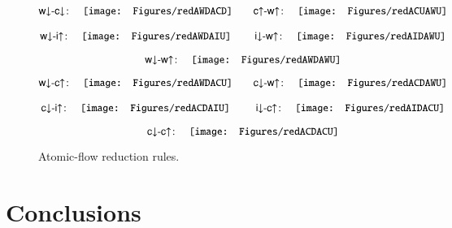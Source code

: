\newcommand{\rwdcd}{{{\mathsf w}{\downarrow}{\hbox{-}}{\mathsf c}{\downarrow}}}
\newcommand{\rwdiu}{{{\mathsf w}{\downarrow}{\hbox{-}}{\mathsf i}{\uparrow  }}}
\newcommand{\rwdwu}{{{\mathsf w}{\downarrow}{\hbox{-}}{\mathsf w}{\uparrow  }}}
\newcommand{\rwdcu}{{{\mathsf w}{\downarrow}{\hbox{-}}{\mathsf c}{\uparrow  }}}
\newcommand{\rcuwu}{{{\mathsf c}{\uparrow  }{\hbox{-}}{\mathsf w}{\uparrow  }}}
\newcommand{\rcdwu}{{{\mathsf c}{\downarrow}{\hbox{-}}{\mathsf w}{\uparrow  }}}
\newcommand{\rcdiu}{{{\mathsf c}{\downarrow}{\hbox{-}}{\mathsf i}{\uparrow  }}}
\newcommand{\rcdcu}{{{\mathsf c}{\downarrow}{\hbox{-}}{\mathsf c}{\uparrow  }}}
\newcommand{\ridwu}{{{\mathsf i}{\downarrow}{\hbox{-}}{\mathsf w}{\uparrow  }}}
\newcommand{\ridcu}{{{\mathsf i}{\downarrow}{\hbox{-}}{\mathsf c}{\uparrow  }}}
\begin{figure}[tbp]
\[
\begin{array}{@{}c@{}c@{}}
\rwdcd\colon\quad
\vcenter{\hbox{\texttt{[image: Figures/redAWDACD]}}}
&\qquad
\rcuwu\colon\quad
\vcenter{\hbox{\texttt{[image: Figures/redACUAWU]}}}
\\\noalign{\bigskip}
\rwdiu\colon\quad
\vcenter{\hbox{\texttt{[image: Figures/redAWDAIU]}}}
&\qquad
\ridwu\colon\quad
\vcenter{\hbox{\texttt{[image: Figures/redAIDAWU]}}}
\\\noalign{\bigskip}
\multispan2{\hfil$
\rwdwu\colon\quad
\vcenter{\hbox{\texttt{[image: Figures/redAWDAWU]}}}
$\hfil}\\\noalign{\bigskip}
\rwdcu\colon\quad
\vcenter{\hbox{\texttt{[image: Figures/redAWDACU]}}}
&\qquad
\rcdwu\colon\quad
\vcenter{\hbox{\texttt{[image: Figures/redACDAWU]}}}
\\\noalign{\bigskip}
\rcdiu\colon\quad
\vcenter{\hbox{\texttt{[image: Figures/redACDAIU]}}}
&\qquad
\ridcu\colon\quad
\vcenter{\hbox{\texttt{[image: Figures/redAIDACU]}}}
\\\noalign{\bigskip}
\multispan2{\hfil$
\rcdcu\colon\quad
\vcenter{\hbox{\texttt{[image: Figures/redACDACU]}}}
$\hfil}\\
\end{array}
\]
\caption{Atomic-flow reduction rules.}
\label{figure:ReductionRules}
\end{figure}%

\section{Conclusions}

